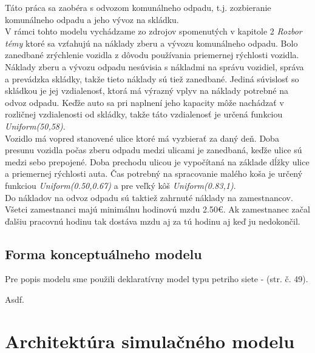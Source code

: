 \documentclass[11pt,a4paper]{article}
\begin{document}
    \indent Táto práca sa zaobéra s odvozom komunálneho odpadu, t.j. zozbieranie komunálneho odpadu a jeho vývoz na skládku.\\[0.4em]
    \indent V rámci tohto modelu vychádzame zo zdrojov spomenutých v kapitole 2 \textit{Rozbor témy} ktoré sa vzťahujú na náklady zberu a vývozu komunálneho odpadu. Bolo zanedbané zrýchlenie vozidla z dôvodu používania priemernej rýchlosti vozidla. Náklady zberu a vývozu odpadu nesúvisia s nákladmi na správu vozidiel, správa a prevádzka skládky, takže tieto náklady sú tiež zanedbané. Jediná súvislosť so skládkou je jej vzdialenosť, ktorá má výrazný vplyv na náklady potrebné na odvoz odpadu. Keďže auto sa pri naplnení jeho kapacity môže nachádzať v rozličnej vzdialenosti od skládky, takže táto vzdialenosť je určená funkciou \textit{Uniform(50,58)}.\\[0.4em]
    \indent Vozidlo má vopred stanovené ulice ktoré má vyzbierať za daný deň. Doba presunu vozidla počas zberu odpadu medzi ulicami je zanedbaná, keďže ulice sú medzi sebo prepojené. Doba prechodu ulicou je vypočítaná na základe dĺžky ulice a priemernej rýchlosti auta. Čas potrebný na spracovanie malého koša je určený funkciou \textit{Uniform(0.50,0.67)} a pre veľký kôš \textit{Uniform(0.83,1)}.\\[0.4em]
    \indent Do nákladov na odvoz odpadu sú taktiež zahrnuté náklady na zamestnancov. Všetci zamestnanci majú minimálnu hodinovú mzdu 2.50\euro{}. Ak zamestnanec začal ďalšiu pracovnú hodinu tak dostáva mzdu aj za tú hodinu aj keď ju nedokončil.

    \subsection{Forma konceptuálneho modelu}

        \indent Pre popis modelu sme použili deklaratívny model typu petriho siete - \cite{IMS}(str. č. 49).


        Asdf.


\section{Architektúra simulačného modelu}
\end{document}
